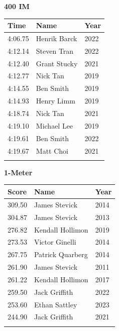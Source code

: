 \vspace{1.2em}
\noindent\begin{minipage}[t]{0.48\textwidth}
\centering
\textbf{\textcolor{teamprimary}{400 IM}}\par
\vspace{0.5em}
\centering
\small
\renewcommand{\arraystretch}{1.0}
\setlength{\tabcolsep}{4pt}
\begin{tabular}{@{}p{1.8cm}p{3.0cm}p{1.0cm}@{}}
\toprule
\textbf{Time} & \textbf{Name} & \textbf{Year} \\
\midrule
4:06.75 & Henrik Barck & 2022 \\
4:12.14 & Steven Tran & 2022 \\
4:12.40 & Grant Stucky & 2021 \\
4:12.77 & Nick Tan & 2019 \\
4:14.55 & Ben Smith & 2019 \\
4:14.93 & Henry Limm & 2019 \\
4:18.74 & Nick Tan & 2021 \\
4:19.10 & Michael Lee & 2019 \\
4:19.61 & Ben Smith & 2022 \\
4:19.67 & Matt Choi & 2021 \\
\bottomrule
\vspace{0.5em}
\end{tabular}
\end{minipage}
\hfill
\begin{minipage}[t]{0.48\textwidth}
\centering
\textbf{\textcolor{teamprimary}{1-Meter}}\par
\vspace{0.5em}
\centering
\small
\renewcommand{\arraystretch}{1.0}
\setlength{\tabcolsep}{4pt}
\begin{tabular}{@{}p{1.8cm}p{3.0cm}p{1.0cm}@{}}
\toprule
\textbf{Score} & \textbf{Name} & \textbf{Year} \\
\midrule
309.50 & James Stevick & 2014 \\
304.87 & James Stevick & 2013 \\
276.82 & Kendall Hollimon & 2019 \\
273.53 & Victor Ginelli & 2014 \\
267.75 & Patrick Quarberg & 2014 \\
261.90 & James Stevick & 2011 \\
261.22 & Kendall Hollimon & 2017 \\
259.50 & Jack Griffith & 2022 \\
253.60 & Ethan Sattley & 2023 \\
244.90 & Jack Griffith & 2021 \\
\bottomrule
\vspace{0.5em}
\end{tabular}
\end{minipage}
